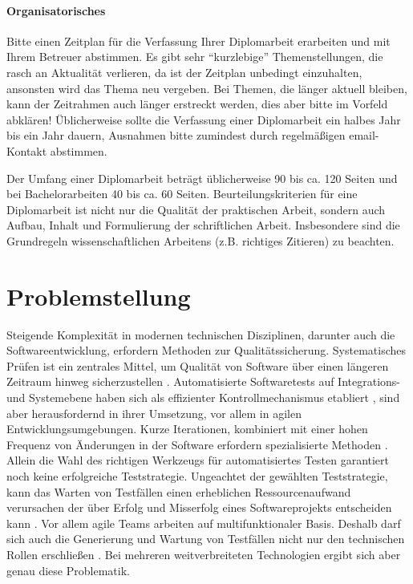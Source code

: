 \paragraph{Organisatorisches}
\makeatletter\ifthesis@masterthesis
Bitte einen Zeitplan für die Verfassung Ihrer Diplomarbeit erarbeiten und mit Ihrem Betreuer abstimmen. Es gibt sehr \enquote{kurzlebige} Themenstellungen, die rasch an Aktualität verlieren, da ist der Zeitplan unbedingt einzuhalten, ansonsten wird das Thema neu vergeben. Bei Themen, die länger aktuell bleiben, kann der Zeitrahmen auch länger erstreckt werden, dies aber bitte im Vorfeld abklären! Üblicherweise sollte die Verfassung einer Diplomarbeit ein halbes Jahr bis ein Jahr dauern, Ausnahmen bitte zumindest durch regelmäßigen email-Kontakt abstimmen.
\fi\makeatother

Der Umfang einer Diplomarbeit beträgt üblicherweise 90 bis ca. 120 Seiten und bei Bachelorarbeiten 40 bis ca. 60 Seiten. Beurteilungskriterien für eine Diplomarbeit ist nicht nur die Qualität der praktischen Arbeit, sondern auch Aufbau, Inhalt und Formulierung der schriftlichen Arbeit. Insbesondere sind die Grundregeln wissenschaftlichen Arbeitens (z.B. richtiges Zitieren) zu beachten.


\section{Problemstellung}

Steigende Komplexität in modernen technischen Disziplinen, darunter auch die Softwareentwicklung, erfordern Methoden zur Qualitätssicherung. Systematisches Prüfen ist ein zentrales Mittel, um Qualität von Software über einen längeren Zeitraum hinweg sicherzustellen \cite{spillner_software_2014}. Automatisierte Softwaretests auf Integrations- und Systemebene haben sich als effizienter Kontrollmechanismus etabliert \cite{dustin_software_2000}, sind aber herausfordernd in ihrer Umsetzung, vor allem in agilen Entwicklungsumgebungen. Kurze Iterationen, kombiniert mit einer hohen Frequenz von Änderungen in der Software erfordern spezialisierte Methoden \cite{linz_testing_2014}. Allein die Wahl des richtigen Werkzeugs für automatisiertes Testen garantiert noch keine erfolgreiche Teststrategie. Ungeachtet der gewählten Teststrategie, kann das Warten von Testfällen einen erheblichen Ressourcenaufwand verursachen der über Erfolg und Misserfolg eines Softwareprojekts entscheiden kann \cite{dustin_software_2000}. Vor allem agile Teams arbeiten auf multifunktionaler Basis. Deshalb darf sich auch die Generierung und Wartung von Testfällen nicht nur den technischen Rollen erschließen \cite{linz_testing_2014}. Bei mehreren weitverbreiteten Technologien ergibt sich aber genau diese Problematik.\\

